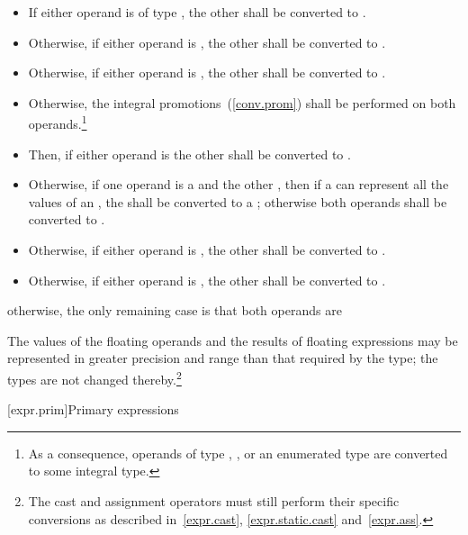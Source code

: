 \begin{itemize}
\item If either operand is of type  , the
other shall be converted to  .

\item Otherwise, if either operand is , the other shall be
converted to .

\item Otherwise, if either operand is , the other shall be
converted to .

\item Otherwise, the integral promotions~(\ref{conv.prom}) shall be
performed on both operands.\footnote{As a consequence, operands of type ,
, or an enumerated type are converted to some integral type.}

\item Then, if either operand is   the
other shall be converted to  .

\item Otherwise, if one operand is a   and the
other  , then if a  
can represent all the values of an  , the
  shall be converted to a 
; otherwise both operands shall be converted to 
 .

\item Otherwise, if either operand is , the other shall be
converted to .

\item Otherwise, if either operand is , the other shall
be converted to .
\end{itemize}

\enternote otherwise, the only remaining case is that both operands are
 \exitnote

\pnum
The values of the floating operands and the results of
floating expressions may be represented in greater precision and range
than that required by the type; the types are not changed thereby.\footnote{The
cast and assignment operators must still perform their specific conversions
as described in~\ref{expr.cast}, \ref{expr.static.cast} and~\ref{expr.ass}.}

[expr.prim]{Primary expressions}%

